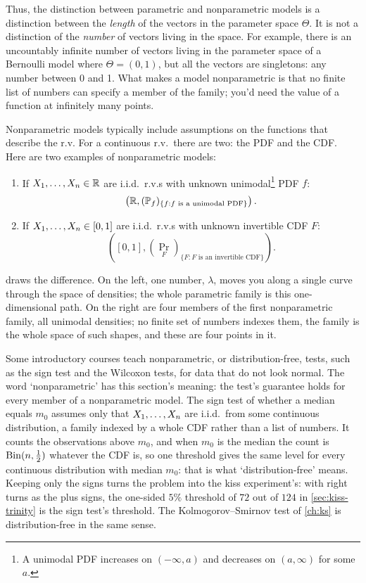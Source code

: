 Thus, the distinction between parametric and nonparametric models is a distinction between the \textit{length} of the vectors in the parameter space $\Theta$.
It is not a distinction of the \textit{number} of vectors living in the space.
For example, there is an uncountably infinite number of vectors living in the parameter space of a Bernoulli model where $\Theta = (0,1)$, but all the vectors are singletons: any number between 0 and 1.
What makes a model nonparametric is that no finite list of numbers can specify a member of the family; you'd need the value of a function at infinitely many points.

Nonparametric models typically include assumptions on the functions that describe the r.v.
For a continuous r.v.\ there are two: the PDF and the CDF.
Here are two examples of nonparametric models:
\begin{enumerate}
\item If $X_1, \ldots, X_n \in \mathbb{R}$ are i.i.d.\ r.v.s with unknown unimodal\footnote{A unimodal PDF increases on $(-\infty, a)$ and decreases on $(a, \infty)$ for some $a$.} PDF $f$:
\[
\left( \mathbb{R}, (\mathbb{P}_f)_{\{f: f \text{ is a unimodal PDF} \}} \right).
\]
\item If $X_1, \ldots, X_n \in [0,1]$ are i.i.d.\ r.v.s with unknown invertible CDF $F$:
\[
\left( [0,1],  (\Pr_F)_{\{F: F \text{ is an invertible CDF} \}} \right).
\]
\end{enumerate}
 draws the difference.
On the left, one number, $\lambda$, moves you along a single curve through the space of densities; the whole parametric family is this one-dimensional path.
On the right are four members of the first nonparametric family, all unimodal densities; no finite set of numbers indexes them, the family is the whole space of such shapes, and these are four points in it.

\begin{bridge}
Some introductory courses teach nonparametric, or distribution-free, tests, such as the sign test and the Wilcoxon tests, for data that do not look normal.
The word `nonparametric' has this section's meaning: the test's guarantee holds for every member of a nonparametric model.
The sign test of whether a median equals $m_0$ assumes only that $X_1, \ldots, X_n$ are i.i.d.\ from some continuous distribution, a family indexed by a whole CDF rather than a list of numbers.
It counts the observations above $m_0$, and when $m_0$ is the median the count is $\mathrm{Bin}(n, \frac12)$ whatever the CDF is, so one threshold gives the same level for every continuous distribution with median $m_0$: that is what `distribution-free' means.
Keeping only the signs turns the problem into the kiss experiment's: with right turns as the plus signs, the one-sided $5\%$ threshold of $72$ out of $124$ in \cref{sec:kiss-trinity} is the sign test's threshold.
The Kolmogorov--Smirnov test of \cref{ch:ks} is distribution-free in the same sense.
\end{bridge}


